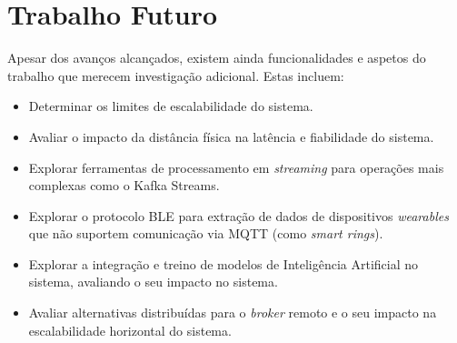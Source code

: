 \section{Trabalho Futuro}
Apesar dos avanços alcançados, existem ainda funcionalidades e aspetos do trabalho que merecem investigação adicional. Estas incluem: 
\begin{itemize}
    \item Determinar os limites de escalabilidade do sistema.
    \item Avaliar o impacto da distância física na latência e fiabilidade do sistema.
    \item Explorar ferramentas de processamento em \textit{streaming} para operações mais complexas como o Kafka Streams.
    \item Explorar o protocolo \ac{BLE} para extração de dados de dispositivos \textit{wearables} que não suportem comunicação via \ac{MQTT} (como \textit{smart rings}).
    \item Explorar a integração e treino de modelos de Inteligência Artificial no sistema, avaliando o seu impacto no sistema.
    \item Avaliar alternativas distribuídas para o \textit{broker} remoto e o seu impacto na escalabilidade horizontal do sistema.
\end{itemize}

